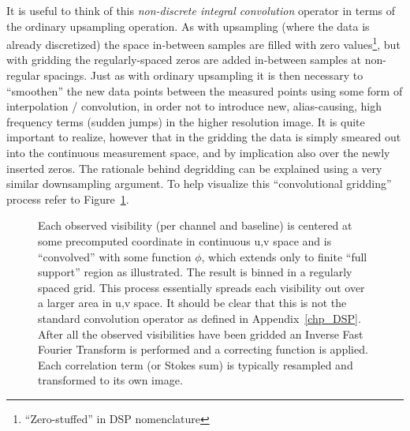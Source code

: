  It is useful to think of this \emph{non-discrete integral convolution} operator in terms of the ordinary upsampling operation. As with upsampling (where
 the data is already discretized) the space in-between samples are filled with zero values\footnote{``Zero-stuffed'' in DSP nomenclature}, but with gridding 
 the regularly-spaced zeros are added in-between samples at non-regular spacings. Just as with ordinary upsampling it is then necessary to ``smoothen'' the new data points 
 between the measured points using some form of interpolation / convolution, in order not to introduce new, alias-causing, high frequency terms (sudden jumps) in the 
 higher resolution image. It is quite important to realize, however that in the gridding the data is simply smeared out into the continuous
 measurement space, and by implication also over the newly inserted zeros. The rationale behind degridding can be explained using a very similar downsampling 
 argument. To help visualize this ``convolutional gridding'' process refer to Figure~\ref{fig_gridding}.
 \begin{figure}[h]
  \begin{mdframed}
   \caption[Illustration of convolutional gridding]{Each observed visibility (per channel and baseline) is centered at some precomputed coordinate in continuous u,v space and 
    is ``convolved'' with some function $\phi$, which extends only to finite ``full support'' region as illustrated. The result is binned in a regularly spaced grid. 
    This process essentially spreads each visibility out over a larger area in u,v space. It should be clear that this is not the standard convolution 
    operator as defined in Appendix~\ref{chp_DSP}. After all the observed visibilities have been gridded an Inverse Fast Fourier Transform is performed 
    and a correcting function is applied. Each correlation term (or Stokes sum) is typically resampled and transformed to its own image.}
   \label{fig_gridding}
  \end{mdframed}
 \end{figure}
 
